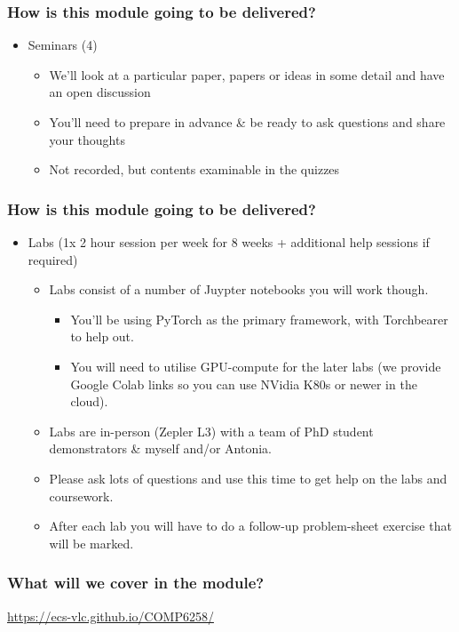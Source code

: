 \documentclass[]{article}
\begin{document}
\begin{frame}
	\frametitle{How is this module going to be delivered?}

	\begin{itemize}
		\item<+-> Seminars (4)
		\begin{itemize}
			\item We'll look at a particular paper, papers or ideas in some detail and have an open discussion
			\item You'll need to prepare in advance \& be ready to ask questions and share your thoughts
			\item Not recorded, but contents examinable in the quizzes
		\end{itemize}
	\end{itemize}
\end{frame}

\begin{frame}
	\frametitle{How is this module going to be delivered?}

	\begin{itemize}
		\item<+-> Labs (1x 2 hour session per week for 8 weeks + additional help sessions if required)
		\begin{itemize}
			\item Labs consist of a number of Juypter notebooks you will work though.
			\begin{itemize}
				\item You'll be using PyTorch as the primary framework, with Torchbearer to help out.
				\item You will need to utilise GPU-compute for the later labs (we provide Google Colab links so you can use NVidia K80s or newer in the cloud).
			\end{itemize}
			\item Labs are in-person (Zepler L3) with a team of PhD student demonstrators \& myself and/or Antonia.
			\item Please ask lots of questions and use this time to get help on the labs and coursework.
			\item After each lab you will have to do a follow-up problem-sheet exercise that will be marked.
		\end{itemize}
	\end{itemize}
\end{frame}

\begin{frame}
	\frametitle{What will we cover in the module?}
	\url{https://ecs-vlc.github.io/COMP6258/}
\end{frame}
\end{document}
